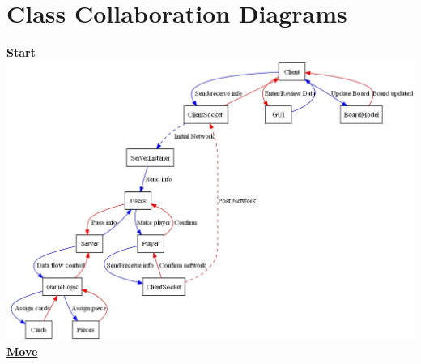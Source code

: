 \part{Class Collaboration Diagrams}

\begin{flushleft}
	{\LARGE \underline{\textbf{Start}}} \\
	\includegraphics[width=6in]{../DesignDocumentation/06_ClassCollaborationDiagrams/start_REV02.jpg}
	\newpage
	{\LARGE \underline{\textbf{Move}}} \\

\end{flushleft}
